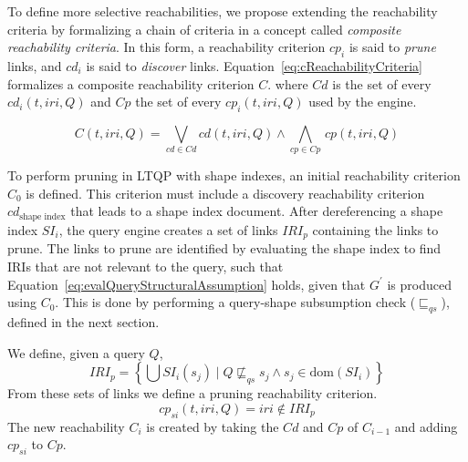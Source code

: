 To define more selective reachabilities, we propose extending the reachability criteria by formalizing a chain of criteria in a concept called \emph{composite reachability criteria}.
In this form, a reachability criterion $cp_i$ is said to \emph{prune} links, and $cd_i$ is said to \emph{discover} links.
Equation~\ref{eq:cReachabilityCriteria} formalizes a composite reachability criterion $C$.
where $Cd$ is the set of every $cd_i(t, iri, Q)$ and $Cp$ the set of every $cp_i(t, iri, Q)$ used by the engine.

\begin{equation}\label{eq:cReachabilityCriteria}
	C(t, iri, Q) = \bigvee_{cd \in Cd} cd(t, iri, Q) \mathrel{\land} \bigwedge_{cp \in Cp} \, cp(t, iri, Q)
\end{equation}


To perform pruning in \ac{LTQP} with shape indexes, an initial reachability criterion $C_0$ is defined.
This criterion must include a discovery reachability criterion $cd_{\text{shape index}}$ that leads to a shape index document.
After dereferencing a shape index $SI_i$, the query engine creates a set of links $IRI_p$ containing the links to prune.
The links to prune are identified by evaluating the shape index to find \acp{IRI} that are not relevant to the query, such that Equation~\ref{eq:evalQueryStructuralAssumption} holds, given that $G^{\prime}$ is produced using $C_0$.
This is done by performing a query-shape subsumption check ($\sqsubseteq_{qs}$), defined in the next section.

We define, given a query $Q$,
$$
	IRI_p = \left\{ \bigcup SI_i(s_j) \mid Q \not\sqsubseteq_{qs}  s_j \land s_j \in \text{dom}(SI_i) \right\}
$$
From these sets of links we define a pruning reachability criterion.
\begin{equation}
	cp_{si}(t, iri, Q) = iri \notin IRI_p
\end{equation}
The new reachability $C_i$ is created by taking the $Cd$ and $Cp$ of $C_{i-1}$ and adding $cp_{si}$ to $Cp$.

